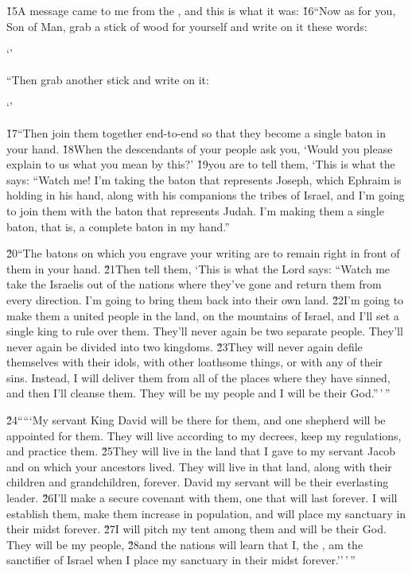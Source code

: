 \v{15}A message came to me from the , and this is what it was: \v{16}``Now as for you, Son of Man, grab a stick of wood for yourself and write on it these words:

\begin{poetry}
\poeml `'
\end{poetry}

``Then grab another stick and write on it:

\begin{poetry}
\poeml `'
\end{poetry}

\v{17}``Then join them together end-to-end so that they become a single baton in your hand. \v{18}When the descendants of your people ask you, `Would you please explain to us what you mean by this?' \v{19}you are to tell them, `This is what the  says: ``Watch me! I'm taking the baton that represents Joseph, which Ephraim is holding in his hand, along with his companions the tribes of Israel, and I'm going to join them with the baton that represents Judah. I'm making them a single baton, that is, a complete baton in my hand.''

\v{20}``The batons on which you engrave your writing are to remain right in front of them in your hand. \v{21}Then tell them, `This is what the Lord  says: ``Watch me take the Israelis out of the nations where they've gone and return them from every direction. I'm going to bring them back into their own land. \v{22}I'm going to make them a united people in the land, on the mountains of Israel, and I'll set a single king to rule over them. They'll never again be two separate people. They'll never again be divided into two kingdoms. \v{23}They will never again defile themselves with their idols, with other loathsome things, or with any of their sins. Instead, I will deliver them from all of the places where they have sinned, and then I'll cleanse them. They will be my people and I will be their God.''\,'\,''

\v{24}`````My servant King David will be there for them, and one shepherd will be appointed for them. They will live according to my decrees, keep my regulations, and practice them. \v{25}They will live in the land that I gave to my servant Jacob and on which your ancestors lived. They will live in that land, along with their children and grandchildren, forever. David my servant will be their everlasting leader. \v{26}I'll make a secure covenant with them, one that will last forever. I will establish them, make them increase in population, and will place my sanctuary in their midst forever. \v{27}I will pitch my tent among them and will be their God. They will be my people, \v{28}and the nations will learn that I, the , am the sanctifier of Israel when I place my sanctuary in their midst forever.''\,'\,''

